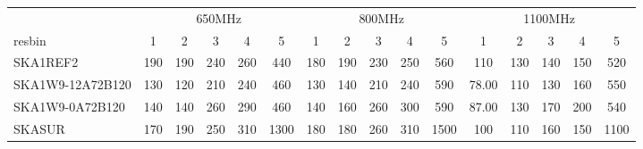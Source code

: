 \begin{table}[!htp]
{{\begin{tabular}{|lccccc||ccccc||ccccc|}
 \tabularnewline \cline{2-16} \multicolumn{1}{c}{ } & \multicolumn{5}{|c}{650MHz}  & \multicolumn{5}{c}{800MHz}  & \multicolumn{5}{c|}{1100MHz} \tabularnewline \cline{1-16} 
 resbin  &1 & 2 & 3 & 4 & 5 & 1 & 2 & 3 & 4 & 5 & 1 & 2 & 3 & 4 & 5 \tabularnewline \hline
SKA1REF2 & 190 \cellcolor{blue!60.00} & 190 \cellcolor{red!60.00} & 240 \cellcolor{green!43.20} & 260 \cellcolor{orange!30.00} & 440 \cellcolor{purple!18.00} & 180 \cellcolor{blue!60.00} & 190 \cellcolor{red!60.00} & 230 \cellcolor{green!34.80} & 250 \cellcolor{orange!24.00} & 560 \cellcolor{purple!18.00} & 110 \cellcolor{blue!60.00} & 130 \cellcolor{red!60.00} & 140 \cellcolor{green!28.50} & 150 \cellcolor{orange!18.00} & 520 \cellcolor{purple!18.00}\\ \hline 
SKA1W9-12A72B120 & 130 \cellcolor{blue!18.00} & 120 \cellcolor{red!18.00} & 210 \cellcolor{green!18.00} & 240 \cellcolor{orange!18.00} & 460 \cellcolor{purple!18.98} & 130 \cellcolor{blue!18.00} & 140 \cellcolor{red!18.00} & 210 \cellcolor{green!18.00} & 240 \cellcolor{orange!18.00} & 590 \cellcolor{purple!19.34} & 78.00 \cellcolor{blue!18.00} & 110 \cellcolor{red!18.00} & 130 \cellcolor{green!18.00} & 160 \cellcolor{orange!26.40} & 550 \cellcolor{purple!20.17}\\ \hline 
SKA1W9-0A72B120 & 140 \cellcolor{blue!25.00} & 140 \cellcolor{red!30.00} & 260 \cellcolor{green!60.00} & 290 \cellcolor{orange!48.00} & 460 \cellcolor{purple!18.98} & 140 \cellcolor{blue!26.40} & 160 \cellcolor{red!34.80} & 260 \cellcolor{green!60.00} & 300 \cellcolor{orange!54.00} & 590 \cellcolor{purple!19.34} & 87.00 \cellcolor{blue!29.81} & 130 \cellcolor{red!60.00} & 170 \cellcolor{green!60.00} & 200 \cellcolor{orange!60.00} & 540 \cellcolor{purple!19.45}\\ \hline 
SKASUR & 170 \cellcolor{blue!46.00} & 190 \cellcolor{red!60.00} & 250 \cellcolor{green!51.60} & 310 \cellcolor{orange!60.00} & 1300 \cellcolor{purple!60.00} & 180 \cellcolor{blue!60.00} & 180 \cellcolor{red!51.60} & 260 \cellcolor{green!60.00} & 310 \cellcolor{orange!60.00} & 1500 \cellcolor{purple!60.00} & 100 \cellcolor{blue!46.88} & 110 \cellcolor{red!18.00} & 160 \cellcolor{green!49.50} & 150 \cellcolor{orange!18.00} & 1100 \cellcolor{purple!60.00}\tabularnewline \hline 
\end{tabular}}\hfil 
{}}
\end{table}
